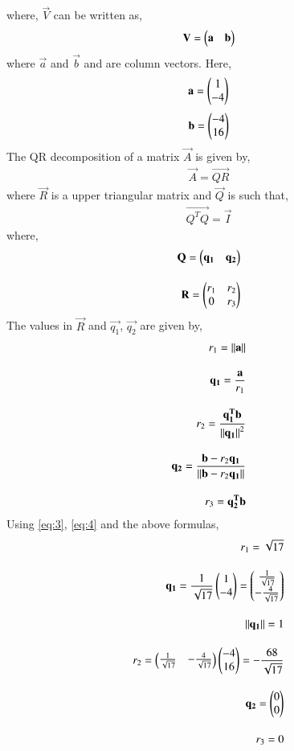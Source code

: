 \documentclass[journal,12pt,twocolumn]{IEEEtran}
\begin{document}
where, $\vec{V}$ can be written as,
\begin{align}
    \mathbf{V} = \begin{pmatrix}\mathbf{a} & \mathbf{b}\end{pmatrix} \label{eq:2}
\end{align}
where $\vec{a}$ and $\vec{b}$ and  are column vectors.
Here, 
\begin{align}
    \mathbf{a} = \begin{pmatrix}1 \\ -4\end{pmatrix} \label{eq:3}
\end{align}
\begin{align}
    \mathbf{b} = \begin{pmatrix}-4 \\ 16\end{pmatrix} \label{eq:4}
\end{align}
The QR decomposition of a matrix $\vec{A}$ is given by, 
\begin{align}
    \vec{A} = \vec{QR}
\end{align}
where $\vec{R}$ is a upper triangular matrix and $\vec{Q}$ is such that, 
\begin{align}
    \vec{Q^TQ} = \vec{I}
\end{align}
where,
\begin{align}
    \mathbf{Q} = \begin{pmatrix}\mathbf{q_1} & \mathbf{q_2}\end{pmatrix} \\[1em]
    \mathbf{R} = \begin{pmatrix}r_1 & r_2 \\ 0 & r_3\end{pmatrix}    
\end{align}
The values in $\vec{R}$ and $\vec{q_1}$, $\vec{q_2}$  are given by,
\begin{align}
    r_1 = \left\lVert\mathbf{a}\right\rVert\\[1em]
    \mathbf{q_1} = \frac{\mathbf{a}}{r_1}\\[1em]
    r_2 = \frac{\mathbf{q_1^Tb}}{\left\lVert\mathbf{q_1}\right\rVert^{2}}\\[1em]
    \mathbf{q_2} = \frac{\mathbf{b} - r_2\mathbf{q_1}}{\left\lVert\mathbf{b}-r_2\mathbf{q_1}\right\rVert}\\[1em]
    r_3 = \mathbf{q_2^Tb}
\end{align}
Using \eqref{eq:3}, \eqref{eq:4} and the above formulas, 
\begin{align}
    r_1= \sqrt{17}\\[1em]
    \mathbf{q_1}= \frac{1}{\sqrt{17}} \begin{pmatrix}1\\-4\end{pmatrix} = \begin{pmatrix}\frac{1}{\sqrt{17}}\\ -\frac{4}{\sqrt{17}}\end{pmatrix}\\[1em]
    \left\lVert\mathbf{q_1}\right\rVert = 1\\[1em]
    r_2 = \begin{pmatrix}\frac{1}{\sqrt{17}} & -\frac{4}{\sqrt{17}}\end{pmatrix} \begin{pmatrix}-4\\16\end{pmatrix} = -\frac{68}{\sqrt{17}}\\[1em]
    \mathbf{q_2}= \begin{pmatrix}0\\0\end{pmatrix}\\[1em]
    r_3= 0\\
\end{align}
\end{document}
